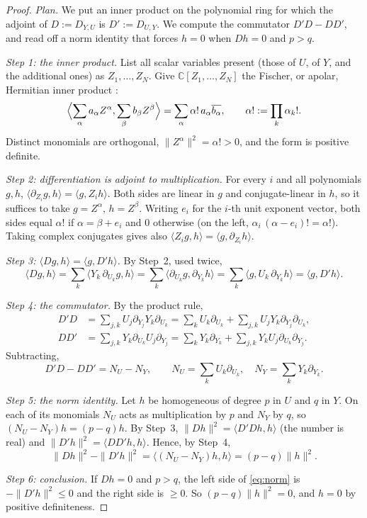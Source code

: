 \documentclass[11pt]{article}
\theoremstyle{definition}
\theoremstyle{remark}
\newcommand{\C}{\mathbb C}
\newcommand{\D}[2]{D_{#1,#2}}
\begin{document}
\begin{proof}
\emph{Plan.} We put an inner product on the polynomial ring for which the
adjoint of $D:=\D YU$ is $D':=\D UY$. We compute the commutator $D'D-DD'$,
and read off a norm identity that forces $h=0$ when $Dh=0$ and $p>q$.

\emph{Step 1: the inner product.}
List all scalar variables present (those of $U$, of $Y$, and the additional
ones) as $Z_1,\ldots,Z_N$. Give $\C[Z_1,\ldots,Z_N]$ the Fischer, or apolar,
Hermitian inner product
\cite[Section~2, equation~(8) and Proposition~3]{AldazRender}:
\[
 \Bigl\langle\sum_\alpha a_\alpha Z^\alpha,\sum_\beta b_\beta Z^\beta\Bigr\rangle
 =\sum_\alpha\alpha!\,a_\alpha\overline{b_\alpha},
 \qquad\alpha!:=\prod_k\alpha_k!.
\]
Distinct monomials are orthogonal, $\|Z^\alpha\|^2=\alpha!>0$, and the form
is positive definite.

\emph{Step 2: differentiation is adjoint to multiplication.}
For every $i$ and all polynomials $g,h$,
$\langle\partial_{Z_i}g,h\rangle=\langle g,Z_ih\rangle$. Both sides are
linear in $g$ and conjugate-linear in $h$, so it suffices to take
$g=Z^\alpha$, $h=Z^\beta$. Writing $e_i$ for the $i$-th unit exponent
vector, both sides equal $\alpha!$ if $\alpha=\beta+e_i$ and $0$ otherwise
(on the left, $\alpha_i\,(\alpha-e_i)!=\alpha!$). Taking complex conjugates
gives also $\langle Z_ig,h\rangle=\langle g,\partial_{Z_i}h\rangle$.

\emph{Step 3: $\langle Dg,h\rangle=\langle g,D'h\rangle$.}
By Step~2, used twice,
\[
 \langle Dg,h\rangle=\sum_k\langle Y_k\,\partial_{U_k}g,h\rangle
 =\sum_k\langle\partial_{U_k}g,\partial_{Y_k}h\rangle
 =\sum_k\langle g,U_k\,\partial_{Y_k}h\rangle=\langle g,D'h\rangle .
\]

\emph{Step 4: the commutator.}
By the product rule,
\begin{align*}
 D'D&=\sum_{j,k}U_j\partial_{Y_j}Y_k\partial_{U_k}
 =\sum_kU_k\partial_{U_k}+\sum_{j,k}U_jY_k\partial_{Y_j}\partial_{U_k},\\
 DD'&=\sum_{j,k}Y_k\partial_{U_k}U_j\partial_{Y_j}
 =\sum_kY_k\partial_{Y_k}+\sum_{j,k}Y_kU_j\partial_{U_k}\partial_{Y_j}.
\end{align*}
Subtracting,
\[
 D'D-DD'=N_U-N_Y,
 \qquad
 N_U=\sum_k U_k\partial_{U_k},\quad
 N_Y=\sum_k Y_k\partial_{Y_k}.
\]

\emph{Step 5: the norm identity.}
Let $h$ be homogeneous of degree $p$ in $U$ and $q$ in $Y$. On each of its
monomials $N_U$ acts as multiplication by $p$ and $N_Y$ by $q$, so
$(N_U-N_Y)h=(p-q)h$. By Step~3,
$\|Dh\|^2=\langle D'Dh,h\rangle$ (the number is real) and
$\|D'h\|^2=\langle DD'h,h\rangle$. Hence, by Step~4,
\begin{equation}\label{eq:norm}
 \|Dh\|^2-\|D'h\|^2=\langle(N_U-N_Y)h,h\rangle=(p-q)\|h\|^2.
\end{equation}

\emph{Step 6: conclusion.}
If $Dh=0$ and $p>q$, the left side of \eqref{eq:norm} is $-\|D'h\|^2\le0$
and the right side is $\ge0$. So $(p-q)\|h\|^2=0$, and $h=0$ by positive
definiteness.
\end{proof}
\end{document}
